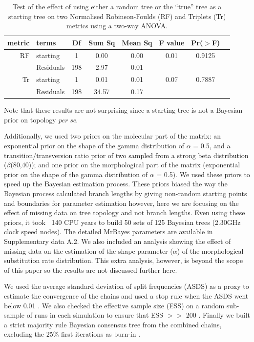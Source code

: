 \begin{table}[ht]
\caption[Effect of using the ``true'' tree as a starting tree]{Test of the effect of using either a random tree or the ``true'' tree as a starting tree on two Normalised Robinson-Foulds (RF) and Triplets (Tr) metrics using a two-way ANOVA.}
\label{Tab_lm_res}
\centering
\begin{tabular}{rlcccccc}
  \hline
 metric & terms & Df & Sum Sq & Mean Sq & F value & Pr($>$F) \\ 
  \hline
RF & starting    & 1 & 0.00 & 0.00 & 0.01 & 0.9125 \\ 
   & Residuals   & 198 & 2.97 & 0.01 &  &  \\ 
Tr & starting    & 1 & 0.01 & 0.01 & 0.07 & 0.7887 \\ 
   & Residuals   & 198 & 34.57 & 0.17 &  &  \\ 
   \hline
\end{tabular}
\end{table}

Note that these results are not surprising since a starting tree is not a Bayesian prior on topology \textit{per se}.

Additionally, we used two priors on the molecular part of the matrix: an exponential prior on the shape of the gamma distribution of $\alpha$ = 0.5, and a transition/transversion ratio prior of two sampled from a strong beta distribution ($\beta$(80,40)); and one prior on the morphological part of the matrix (exponential prior on the shape of the gamma distribution of $\alpha$ = 0.5).
We used these priors to speed up the Bayesian estimation process.
These priors biased the way the Bayesian process calculated branch lengths by giving non-random starting points and boundaries for parameter estimation however, here we are focusing on the effect of missing data on tree topology and not branch lengths.
Even using these priors, it took $~$ 140 CPU years to build 50 sets of 125 Bayesian trees (2.30GHz clock speed nodes).
The detailed MrBayes parameters are available in Supplementary data A.2. %
We also included an analysis showing the effect of missing data on the estimation of the shape parameter ($\alpha$) of the morphological substitution rate distribution.
This extra analysis, however, is beyond the scope of this paper so the results are not discussed further here.

We used the average standard deviation of split frequencies (ASDS) as a proxy to estimate the convergence of the chains and used a stop rule when the ASDS went below 0.01 \citep{Ronquist2012mrbayes}.
We also checked the effective sample size (ESS) on a random sub-sample of runs in each simulation to ensure that ESS $>>$ 200 \citep{drummond2006ess}.
Finally we built a strict majority rule Bayesian consensus tree from the combined chains, excluding the 25\% first iterations as burn-in \citep{Ronquist2012mrbayes}.

